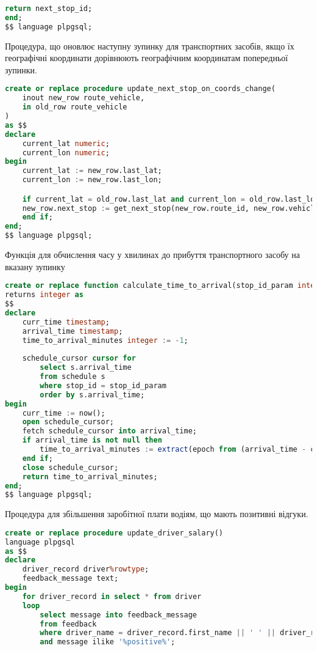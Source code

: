 \documentclass[14pt]{extreport}
\begin{document}
\begin{normalsize}
\begin{small}
\begin{lstlisting}[language=sql]
	return next_stop_id;
end;
$$ language plpgsql;
		\end{lstlisting}
	\end{small}
	
	Процедура, що оновлює наступну зупинку для транспортних засобів, якщо їх географічні координати дорівнюють географічним координатам попередньої зупинки.
	\begin{small}
		\begin{lstlisting}[language=sql]
create or replace procedure update_next_stop_on_coords_change(
	inout new_row route_vehicle,
	in old_row route_vehicle
)
as $$
declare
	current_lat numeric;
	current_lon numeric;
begin
	current_lat := new_row.last_lat;
	current_lon := new_row.last_lon;

	if current_lat = old_row.last_lat and current_lon = old_row.last_lon then
	new_row.next_stop := get_next_stop(new_row.route_id, new_row.vehicle_id);
	end if;
end;
$$ language plpgsql;
		\end{lstlisting}
	\end{small}
	
	Функція для обчислення часу у хвилинах до прибуття транспортного засобу на вказану зупинку
	\begin{small}
		\begin{lstlisting}[language=sql]
create or replace function calculate_time_to_arrival(stop_id_param integer)
returns integer as
$$
declare
	curr_time timestamp;
	arrival_time timestamp;
	time_to_arrival_minutes integer := -1;
	
	schedule_cursor cursor for
		select s.arrival_time
		from schedule s
		where stop_id = stop_id_param
		order by s.arrival_time;
begin
	curr_time := now();
	open schedule_cursor;
	fetch schedule_cursor into arrival_time;
	if arrival_time is not null then
		time_to_arrival_minutes := extract(epoch from (arrival_time - curr_time)) / 60;
	end if;
	close schedule_cursor;
	return time_to_arrival_minutes;
end;
$$ language plpgsql;
		\end{lstlisting}
	\end{small}
	
	Процедура для збільшення заробітної плати водіям, що мають позитивні відгуки.
	\begin{small}
		\begin{lstlisting}[language=sql]
create or replace procedure update_driver_salary()
language plpgsql
as $$
declare
	driver_record driver%rowtype;
	feedback_message text;
begin
	for driver_record in select * from driver
	loop
		select message into feedback_message
		from feedback
		where driver_name = driver_record.first_name || ' ' || driver_record.last_name
		and message ilike '%positive%';
		

\end{lstlisting}
\end{small}
\end{normalsize}
\end{document}
